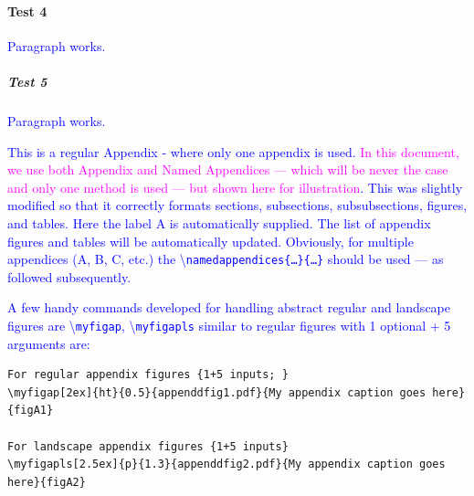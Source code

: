 \documentclass[phd]{ndsu-thesis-2022}
\newcommand\italk[1]{\textcolor{blue}{#1}}  %
\newcommand\cmd[1]{\textbackslash\texttt{#1}}  %
\begin{document}
\paragraph{Test 4}
\italk{Paragraph works.} 

\subparagraph{Test 5}
\italk{Paragraph works.} 


\renewcommand{\bibname}{REFERENCES}

\makerefs %

\label{biblio}


\appendix %

\italk{This is a regular Appendix - where only one appendix is used. \textcolor{magenta}{In this document, we use both Appendix and Named Appendices --- which will be never the case and only one method is used --- but shown here for illustration}. This was slightly modified so that it correctly formats sections, subsections, subsubsections, figures, and tables. Here the label A is automatically supplied. The list of appendix figures and tables will be automatically updated. Obviously, for multiple appendices (A, B, C, etc.) the \cmd{namedappendices\{\ldots\}\{\ldots\}} should be used --- as followed subsequently.}

\italk{A few handy commands developed for handling abstract regular and landscape figures are \cmd{myfigap}, \cmd{myfigapls} similar to regular figures with 1 optional + 5 arguments are: } 

\label{figv}
\vspace{2ex}
{\singlespacing
\begin{verbatim}
For regular appendix figures {1+5 inputs; }
\myfigap[2ex]{ht}{0.5}{appenddfig1.pdf}{My appendix caption goes here}{figA1}

For landscape appendix figures {1+5 inputs}
\myfigapls[2.5ex]{p}{1.3}{appenddfig2.pdf}{My appendix caption goes here}{figA2}
\end{verbatim}
}
\end{document}
